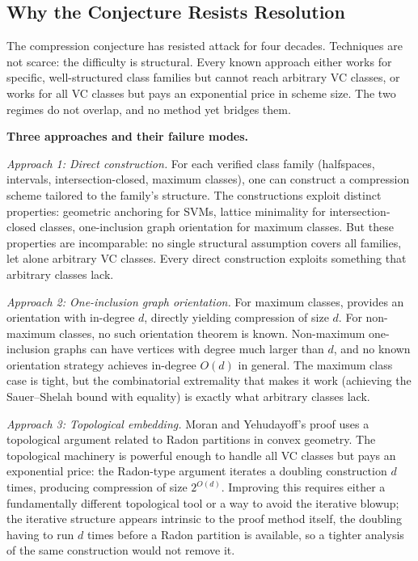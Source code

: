 \subsection{Why the Conjecture Resists Resolution}
\label{sec:why-hard}

The compression conjecture has resisted attack for four decades.  Techniques
are not scarce: the difficulty is structural.  Every known approach either
works for specific, well-structured class families but cannot reach arbitrary
VC classes, or works for all VC classes but pays an exponential price in scheme
size.  The two regimes do not overlap, and no method yet bridges them.

\begin{obstbox}
\textbf{Three approaches and their failure modes.}

\medskip
\emph{Approach 1: Direct construction.}  For each verified class
family (halfspaces, intervals, intersection-closed, maximum classes),
one can construct a compression scheme tailored to the family's
structure.  The constructions exploit distinct properties: geometric
anchoring for SVMs, lattice minimality for intersection-closed classes,
one-inclusion graph orientation for maximum classes.  But these
properties are incomparable: no single structural assumption covers all
families, let alone arbitrary VC classes.  Every direct construction
exploits something that arbitrary classes lack.

\medskip
\emph{Approach 2: One-inclusion graph orientation.}  For maximum
classes,  provides an orientation
with in-degree $d$, directly yielding compression of size $d$.  For
non-maximum classes, no such orientation theorem is known.
Non-maximum one-inclusion graphs can have vertices with degree much
larger than $d$, and no known orientation strategy achieves in-degree
$O(d)$ in general.  The maximum class case is tight, but the
combinatorial extremality that makes it work (achieving the
Sauer--Shelah bound with equality) is exactly what arbitrary classes
lack.

\medskip
\emph{Approach 3: Topological embedding.}  Moran and Yehudayoff's
proof uses a topological argument related to Radon partitions in
convex geometry.  The topological machinery is powerful enough to
handle all VC classes but pays an exponential price: the Radon-type
argument iterates a doubling construction $d$ times, producing
compression of size $2^{O(d)}$.  Improving this requires either a
fundamentally different topological tool or a way to avoid the
iterative blowup; the iterative structure appears intrinsic to
the proof method itself, the doubling having to run $d$ times before a
Radon partition is available, so a tighter analysis of the same
construction would not remove it.


\end{obstbox}
